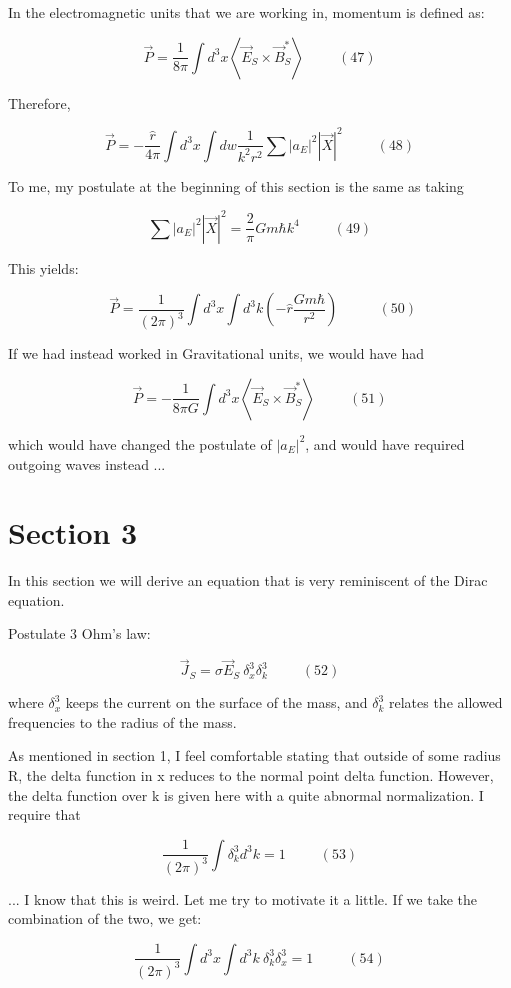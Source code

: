 \documentclass {article}
\begin{document}
In the electromagnetic units that we are working in, momentum is defined as:

$$\vec P = \frac 1 {8 \pi} \int d^3x \left< \vec E_S \times \vec B_S^* \right> ~~~~~~~~~~~ (47)$$

Therefore,

$$\vec P = - \frac {\hat r} {4 \pi} \int d^3x \int dw \frac 1 {k^2 r^2} \sum |a_E|^2 |\vec X|^2 ~~~~~~~~~~~ (48)$$

To me, my postulate at the beginning of this section is the same as taking 

$$\sum |a_E|^2 |\vec X|^2 = \frac 2 {\pi} Gm \hbar k^4 ~~~~~~~~~~~ (49)$$

This yields:

$$\boxed{~~  \vec P = \frac 1 {(2 \pi)^3} \int d^3x \int d^3k \left(- \hat r \frac {Gm \hbar} {r^2}\right) ~~ } ~~~~~~~~~~~ (50)$$

If we had instead worked in Gravitational units, we would have had

$$\vec P = - \frac 1 {8 \pi G} \int d^3x \left< \vec E_S \times \vec B_S^* \right> ~~~~~~~~~~~ (51)$$

which would have changed the postulate of $|a_E|^2$, and would have required outgoing waves instead ... 

\section{Section 3}

In this section we will derive an equation that is very reminiscent of the Dirac equation.

Postulate 3 Ohm's law:

$$\vec J_S = \sigma \vec E_S  ~ \delta^3_x \delta^3_k ~~~~~~~~~~~ (52)$$

where $\delta^3_x$ keeps the current on the surface of the mass, and $\delta^3_k$ relates the allowed frequencies to the radius of the mass. 

As mentioned in section 1, I feel comfortable stating that outside of some radius R, the delta function in x reduces to the normal point delta function. However, the delta function over k is given here with a quite abnormal normalization. I require that

$$\frac 1 {(2 \pi)^3} \int \delta^3_k d^3k = 1 ~~~~~~~~~~~ (53)$$

... I know that this is weird. Let me try to motivate it a little. If we take the combination of the two, we get:

$$\frac 1 {(2 \pi)^3} \int d^3x \int d^3k ~ \delta^3_k \delta^3_x = 1 ~~~~~~~~~~~ (54)$$
\end{document}
